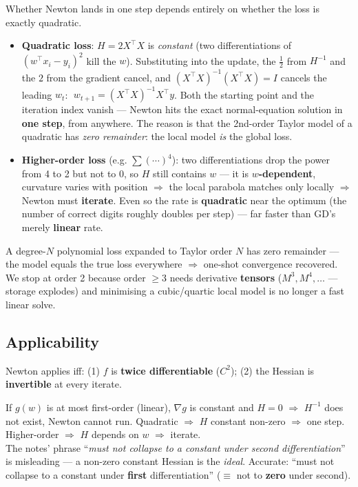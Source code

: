 \documentclass[11pt, a4paper]{article}
\newcommand{\kw}[1]{\textbf{#1}}
\begin{document}
Whether Newton lands in one step depends entirely on whether the loss is exactly quadratic.

\begin{itemize}
  \item \kw{Quadratic loss}: $H=2X^\top X$ is \emph{constant} (two differentiations of
  $(w^\top x_i-y_i)^2$ kill the $w$). Substituting into the update, the $\tfrac12$ from $H^{-1}$ and
  the $2$ from the gradient cancel, and $(X^\top X)^{-1}(X^\top X)=I$ cancels the leading $w_t$:
  $\;w_{t+1}=(X^\top X)^{-1}X^\top y$. Both the starting point and the iteration index vanish — Newton
  hits the exact normal-equation solution in \kw{one step}, from anywhere. The reason is that the
  2nd-order Taylor model of a quadratic has \emph{zero remainder}: the local model \emph{is} the
  global loss.
  \item \kw{Higher-order loss} (e.g. $\sum(\cdots)^4$): two differentiations drop the power from 4 to
  2 but not to 0, so $H$ still contains $w$ — it is \kw{$w$-dependent}, curvature varies with
  position $\Rightarrow$ the local parabola matches only locally $\Rightarrow$ Newton must
  \kw{iterate}. Even so the rate is \kw{quadratic} near the optimum (the number of correct digits
  roughly doubles per step) — far faster than GD's merely \kw{linear} rate.
\end{itemize}

\begin{notebox}
A degree-$N$ polynomial loss expanded to Taylor order $N$ has zero remainder — the model equals the
true loss everywhere $\Rightarrow$ one-shot convergence recovered. We stop at order 2 because order
$\ge3$ needs derivative \kw{tensors} ($M^3,M^4,\dots$ — storage explodes) and minimising a
cubic/quartic local model is no longer a fast linear solve.
\end{notebox}

\subsection{Applicability}

\begin{defbox}
Newton applies iff: (1) $f$ is \kw{twice differentiable} ($C^2$); (2) the Hessian is
\kw{invertible} at every iterate.
\end{defbox}

\begin{notebox}
If $g(w)$ is at most first-order (linear), $\nabla g$ is constant and $H=0$ $\Rightarrow$ $H^{-1}$
does not exist, Newton cannot run. Quadratic $\Rightarrow$ $H$ constant non-zero $\Rightarrow$ one
step. Higher-order $\Rightarrow$ $H$ depends on $w$ $\Rightarrow$ iterate. \\
The notes' phrase ``\emph{must not collapse to a constant under second differentiation}'' is
misleading — a non-zero constant Hessian is the \emph{ideal}. Accurate: ``must not collapse to a
constant under \kw{first} differentiation'' ($\equiv$ not to \kw{zero} under second).
\end{notebox}
\end{document}
